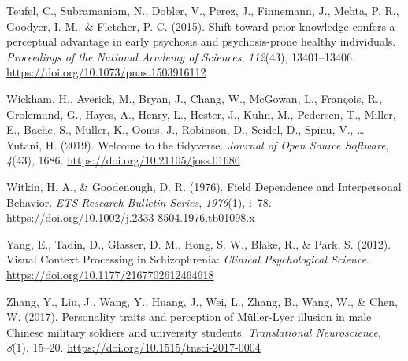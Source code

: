 \documentclass[
  man,floatsintext]{apa6}
\newlength{\cslhangindent}
\newlength{\cslentryspacingunit} %
\newenvironment{CSLReferences}[2] %
 {%
  \setlength{\parindent}{0pt}
  \ifodd #1
  \let\oldpar\par
  \def\par{\hangindent=\cslhangindent\oldpar}
  \fi
  \setlength{\parskip}{#2\cslentryspacingunit}
 }%
 {}
\begin{document}
\begin{CSLReferences}{1}{0}
\leavevmode{}%
Teufel, C., Subramaniam, N., Dobler, V., Perez, J., Finnemann, J., Mehta, P. R., Goodyer, I. M., \& Fletcher, P. C. (2015). Shift toward prior knowledge confers a perceptual advantage in early psychosis and psychosis-prone healthy individuals. \emph{Proceedings of the National Academy of Sciences}, \emph{112}(43), 13401--13406. \url{https://doi.org/10.1073/pnas.1503916112}

\leavevmode{}%
Wickham, H., Averick, M., Bryan, J., Chang, W., McGowan, L., François, R., Grolemund, G., Hayes, A., Henry, L., Hester, J., Kuhn, M., Pedersen, T., Miller, E., Bache, S., Müller, K., Ooms, J., Robinson, D., Seidel, D., Spinu, V., \ldots{} Yutani, H. (2019). Welcome to the tidyverse. \emph{Journal of Open Source Software}, \emph{4}(43), 1686. \url{https://doi.org/10.21105/joss.01686}

\leavevmode{}%
Witkin, H. A., \& Goodenough, D. R. (1976). Field Dependence and Interpersonal Behavior. \emph{ETS Research Bulletin Series}, \emph{1976}(1), i--78. \url{https://doi.org/10.1002/j.2333-8504.1976.tb01098.x}

\leavevmode{}%
Yang, E., Tadin, D., Glasser, D. M., Hong, S. W., Blake, R., \& Park, S. (2012). Visual Context Processing in Schizophrenia: \emph{Clinical Psychological Science}. \url{https://doi.org/10.1177/2167702612464618}

\leavevmode{}%
Zhang, Y., Liu, J., Wang, Y., Huang, J., Wei, L., Zhang, B., Wang, W., \& Chen, W. (2017). Personality traits and perception of Müller-Lyer illusion in male Chinese military soldiers and university students. \emph{Translational Neuroscience}, \emph{8}(1), 15--20. \url{https://doi.org/10.1515/tnsci-2017-0004}

\end{CSLReferences}


\clearpage
\renewcommand{\listfigurename}{Figure captions}
\end{document}
